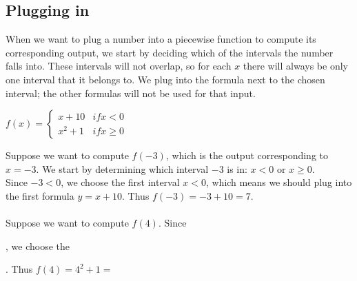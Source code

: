 \documentclass{ximera}
\begin{document}
\subsection*{Plugging in}
When we want to plug a number into a piecewise function to compute its corresponding output, we start by deciding which of the intervals the number falls into. These intervals will not overlap, so for each $x$ there will always be only one interval that it belongs to. We plug into the formula next to the chosen interval; the other formulas will not be used for that input.

\begin{example}
$f(x)=\begin{cases} x+10 & \textit{if}x<0\\x^2+1 & \textit{if} x\geq 0\end{cases}$

Suppose we want to compute $f(-3)$, which is the output corresponding to $x=-3$. We start by determining which interval $-3$ is in: $x<0$ or $x\geq 0$. \\Since $-3<0$, we choose the first interval $x<0$, which means we should plug into the first formula $y=x+10$. Thus $f(-3)=-3+10=7$.
\\
\\Suppose we want to compute $f(4)$. Since 
\begin{multipleChoice}
  \end{multipleChoice}
, we choose the 
\begin{multipleChoice}
  \end{multipleChoice}. Thus $f(4)=4^2+1=$
  \begin{multipleChoice}
  \end{multipleChoice}
\end{example}
\end{document}
